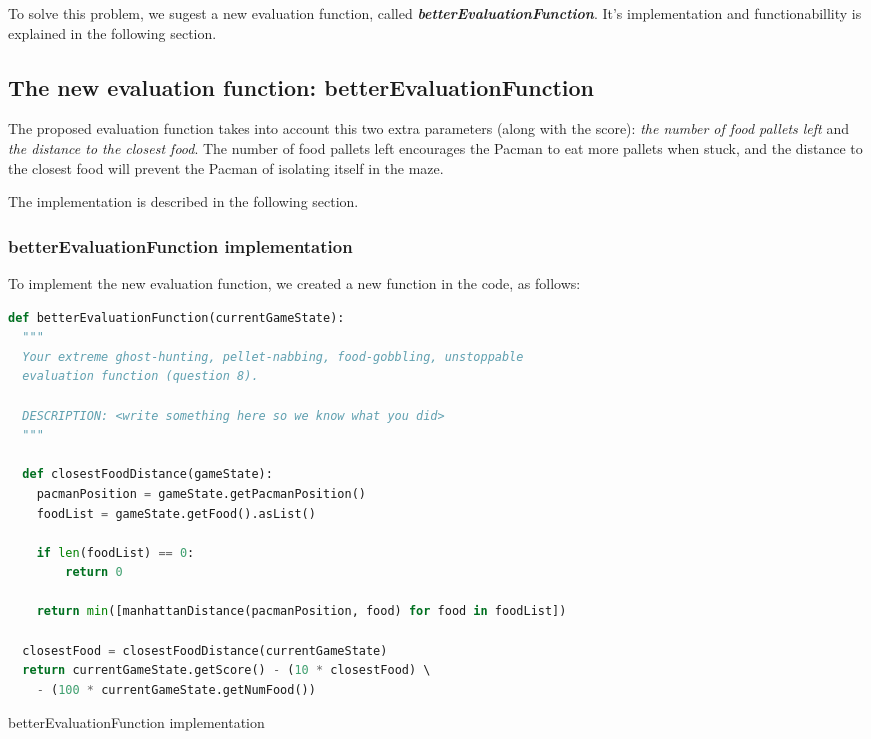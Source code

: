 \documentclass{article}
\begin{document}
To solve this problem, we sugest a new evaluation function, called \textit{\textbf{betterEvaluationFunction}}. It's implementation and functionabillity is explained in the following section.

\subsection{The new evaluation function: betterEvaluationFunction}

The proposed evaluation function takes into account this two extra parameters (along with the score): \textit{the number of food pallets left} and \textit{the distance to the closest food}. The number of food pallets left encourages the Pacman to eat more pallets when stuck, and the distance to the closest food will prevent the Pacman of isolating itself in the maze.

The implementation is described in the following section.

\subsubsection{betterEvaluationFunction implementation}

To implement the new evaluation function, we created a new function in the code, as follows:

\begin{table}[!ht]
  \begin{lstlisting}[language=python, frame=tlbr, framesep=6pt, backgroundcolor=\color{light-gray}]
def betterEvaluationFunction(currentGameState):
  """
  Your extreme ghost-hunting, pellet-nabbing, food-gobbling, unstoppable
  evaluation function (question 8).

  DESCRIPTION: <write something here so we know what you did>
  """
  
  def closestFoodDistance(gameState):
    pacmanPosition = gameState.getPacmanPosition()
    foodList = gameState.getFood().asList()

    if len(foodList) == 0:
        return 0

    return min([manhattanDistance(pacmanPosition, food) for food in foodList])

  closestFood = closestFoodDistance(currentGameState)
  return currentGameState.getScore() - (10 * closestFood) \ 
    - (100 * currentGameState.getNumFood())
  \end{lstlisting}
  \caption{betterEvaluationFunction implementation}
\end{table}
\end{document}
